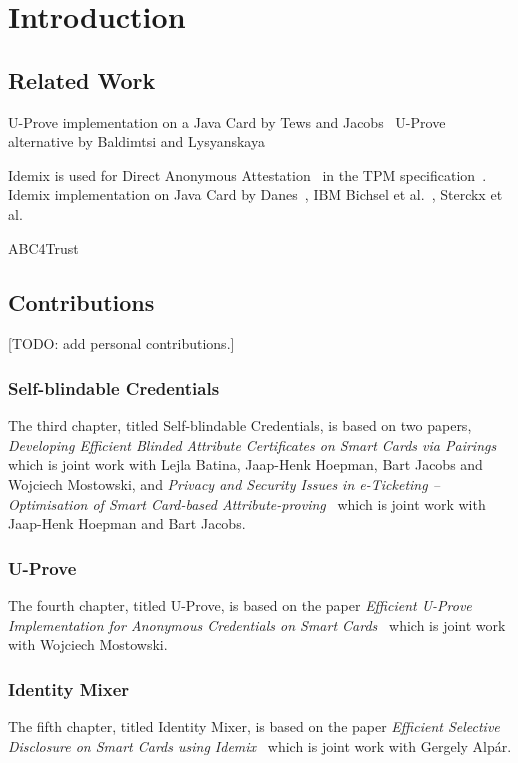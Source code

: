 \chapter{Introduction}

\section{Related Work}

U-Prove implementation on a Java Card by Tews and Jacobs~\cite{TewsJacobs09}
U-Prove alternative by Baldimtsi and Lysyanskaya~\cite{BaLy2012}

Idemix is used for Direct Anonymous Attestation~\cite{BrickellCC2004} in the TPM
specification~\cite{TPM}.
Idemix implementation on Java Card by Danes~\cite{Danes}, IBM Bichsel et al.~\cite{BichselCGS2009}, Sterckx et al.~\cite{Sterckx09}

ABC4Trust

\section{Contributions}

[TODO: add personal contributions.]

\subsection{Self-blindable Credentials}

The third chapter, titled Self-blindable Credentials, is based on two papers,
\emph{Developing Efficient Blinded Attribute Certificates on Smart Cards via
Pairings}~\cite{BatinaHJMV10} which is joint work with Lejla Batina, Jaap-Henk
Hoepman, Bart Jacobs and Wojciech Mostowski, and \emph{Privacy and Security
Issues in e-Ticketing -- Optimisation of Smart Card-based
Attribute-proving}~\cite{HoepmanJV10} which is joint work with Jaap-Henk
Hoepman and Bart Jacobs.

\subsection{U-Prove}

The fourth chapter, titled U-Prove, is based on the paper \emph{Efficient
U-Prove Implementation for Anonymous Credentials on Smart
Cards}~\cite{MostowskiVullers11} which is joint work with Wojciech Mostowski.

\subsection{Identity Mixer}

The fifth chapter, titled Identity Mixer, is based on the paper \emph{Efficient
Selective Disclosure on Smart Cards using Idemix}~\cite{VullersAlpar2013} which
is joint work with Gergely Alp\'ar.